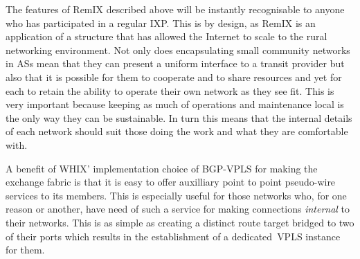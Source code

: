 The features of RemIX described above will be instantly recognisable
to anyone who has participated in a regular \ac{IXP}. This is by
design, as RemIX is an application of a structure that has allowed the
Internet to scale to the rural networking environment. Not only does
encapsulating small community networks in \acp{AS} mean that they can
present a uniform interface to a transit provider but also that it is
possible for them to cooperate and to share resources and yet for each
to retain the ability to operate their own network as they see
fit. This is very important because keeping as much of operations and
maintenance local is the only way they can be sustainable. In turn
this means that the internal details of each network should suit those
doing the work and what they are comfortable with.

A benefit of \ac{WHIX}' implementation choice of \ac{BGP}-\ac{VPLS}
for making the exchange fabric is that it is easy to offer auxilliary
point to point pseudo-wire services to its members. This is especially
useful for those networks who, for one reason or another, have need of
such a service for making connections \emph{internal} to their
networks. This is as simple as creating a distinct route target
bridged to two of their ports which results in the establishment of a
dedicated~\ac{VPLS} instance for them.
